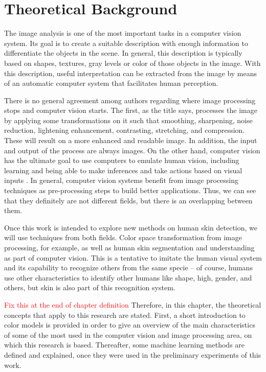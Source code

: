 \chapter{Theoretical Background}
\label{cap:conceitos}
The image analysis is one of the most important tasks in a computer vision system. Its goal is to create a suitable description with enough information to differentiate the objects in the scene. In general, this description is typically based on shapes, textures, gray levels or color of those objects in the image. With this description, useful interpretation can be extracted from the image by means of an automatic computer system that facilitates human perception.

There is no general agreement among authors regarding where image processing stops and computer vision starts. The first, as the title says, processes the image by applying some transformations on it such that smoothing, sharpening, noise reduction, lightening enhancement, contrasting, stretching, and compression. These will result on a more enhanced and readable image. In addition, the input and output of the process are always images. On the other hand, computer vision has the ultimate goal to use computers to emulate human vision, including learning and being able to make inferences and take actions based on visual inputs \citep{gonzalez:02}. In general, computer vision systems benefit from image processing techniques as pre-processing steps to build better applications. Thus, we can see that they definitely are not different fields, but there is an overlapping between them.

Once this work is intended to explore new methods on human skin detection, we will use techniques from both fields. Color space transformation from image processing, for example, as well as human skin segmentation and understanding as part of computer vision. This is a tentative to imitate the human visual system and its capability to recognize others from the same specie -- of course, humans use other characteristics to identify other humans like shape, high, gender, and others, but skin is also part of this recognition system.

\textcolor{red}{Fix this at the end of chapter definition} Therefore, in this chapter, the theoretical concepts that apply to this research are stated. First, a short introduction to color models is provided in order to give an overview of the main characteristics of some of the most used in the computer vision and image processing area, on which this research is based. Thereafter, some machine learning methods are defined and explained, once they were used in the preliminary experiments of this work.                                                                                                                               
